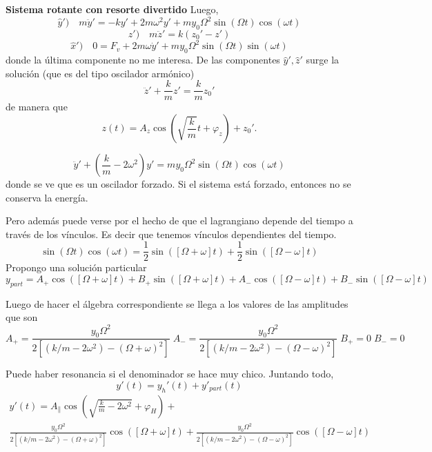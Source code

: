 \documentclass[10pt,oneside]{CBFT_book}
\begin{document}
\begin{ejemplo}{\bf Sistema rotante con resorte divertido}
Luego,
\[
	\hat{y}' ) \quad m \ddot{y}' = -k y' + 2 m \omega^2 y' + m y_0 \Omega^2 \sin(\Omega t)\cos(\omega t)
\]
\[
	\hat{z}' ) \quad m \ddot{z}' = k ( z_0' - z' )
\]
\[
	\hat{x}' ) \quad 0 = F_v + 2m\omega \dot{y}' + m y_0 \Omega^2 \sin(\Omega t)\sin(\omega t)
\]
donde la última componente no me interesa.
De las componentes $\hat{y}',\hat{z}'$ surge la solución (que es del tipo oscilador armónico)
\[
	\ddot{z}' + \frac k m z' = \frac k m z_0'
\]
de manera que 
\[
	z(t) = A_z \cos\left( \sqrt{\frac{k}{m}} t + \varphi_z \right) + z_0'.
\]

\[
	\ddot{y}' + \left( \frac k m - 2\omega^2 \right) y' =  m y_0 \Omega^2 \sin( \Omega t) \cos (\omega t)
\]
donde se ve que es un oscilador forzado.
Si el sistema está forzado, entonces no se conserva la energía.

Pero además puede verse por el hecho de que el lagrangiano depende del tiempo a través de los vínculos. Es decir que
tenemos vínculos dependientes del tiempo.
\[
	\sin( \Omega t) \cos (\omega t) = \frac{1}{2} \sin( [\Omega + \omega] t ) +  \frac{1}{2} \sin( [\Omega - \omega] t )
\]
Propongo una solución particular 
\[
	y_{part} = A_+ \cos( [\Omega + \omega] t ) + B_+ \sin( [\Omega + \omega] t ) 
		+ A_- \cos([\Omega - \omega] t) + B_- \sin([\Omega - \omega] t)
\]

Luego de hacer el álgebra correspondiente se llega a los valores de las amplitudes que son 
\[
	A_+ = \frac{ y_0 \Omega^2 }{ 2[ ( k/m - 2 \omega^2 ) - (\Omega + \omega)^2 ] } \;
	A_- = \frac{ y_0 \Omega^2 }{ 2[ ( k/m - 2 \omega^2 ) - (\Omega - \omega)^2 ] } \; B_+=0 \; B_-=0
\]

Puede haber resonancia si el denominador se hace muy chico. Juntando todo,
\[
	y'(t) = y_h'(t) + y'_{part}(t)
\]
\begin{multline*}
	y'(t) = A_{\parallel} \cos\left( \sqrt{ \frac k m - 2 \omega^2 } + \varphi_H \right) + \\
	\frac{ y_0 \Omega^2 }{ 2[ ( k/m - 2 \omega^2 ) - (\Omega + \omega)^2 ] } \cos([\Omega +\omega] t ) + 
	\frac{ y_0 \Omega^2 }{ 2[ ( k/m - 2 \omega^2 ) - (\Omega - \omega)^2 ] } \cos([ \Omega - \omega ] t )
\end{multline*}
\end{ejemplo}
\end{document}
